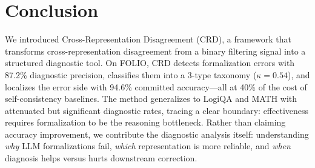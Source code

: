 \documentclass[11pt,a4paper]{article}
\newcommand{\method}{CRD}
\begin{document}
\section{Conclusion}

We introduced Cross-Representation Disagreement (\method{}), a framework that transforms cross-representation disagreement from a binary filtering signal into a structured diagnostic tool.
On FOLIO, \method{} detects formalization errors with 87.2\% diagnostic precision, classifies them into a 3-type taxonomy ($\kappa{=}0.54$), and localizes the error side with 94.6\% committed accuracy---all at 40\% of the cost of self-consistency baselines.
The method generalizes to LogiQA and MATH with attenuated but significant diagnostic rates, tracing a clear boundary: effectiveness requires formalization to be the reasoning bottleneck.
Rather than claiming accuracy improvement, we contribute the diagnostic analysis itself: understanding \emph{why} LLM formalizations fail, \emph{which} representation is more reliable, and \emph{when} diagnosis helps versus hurts downstream correction.
\end{document}
